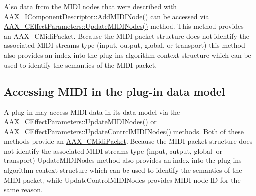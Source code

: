 Also data from the M\+I\+DI nodes that were described with \mbox{\hyperlink{a01781_a6284dda9ccca898e33075de29dad4e39}{A\+A\+X\+\_\+\+I\+Component\+Descriptor\+::\+Add\+M\+I\+D\+I\+Node()}} can be accessed via \mbox{\hyperlink{a01481_aac6fa72278c0f46aa430cd79bdb2d767}{A\+A\+X\+\_\+\+C\+Effect\+Parameters\+::\+Update\+M\+I\+D\+I\+Nodes()}} method. This method provides an \mbox{\hyperlink{a01429}{A\+A\+X\+\_\+\+C\+Midi\+Packet}}. Because the M\+I\+DI packet structure does not identify the associated M\+I\+DI stream\textquotesingle{}s type (input, output, global, or transport) this method also provides an index into the plug-\/in\textquotesingle{}s algorithm context structure which can be used to identify the semantics of the M\+I\+DI packet.\hypertarget{a00806_additionalFeatures_MIDI_DataModel}{}\subsection{Accessing M\+I\+D\+I in the plug-\/in data model}\label{a00806_additionalFeatures_MIDI_DataModel}
A plug-\/in may access M\+I\+DI data in its data model via the \mbox{\hyperlink{a01481_aac6fa72278c0f46aa430cd79bdb2d767}{A\+A\+X\+\_\+\+C\+Effect\+Parameters\+::\+Update\+M\+I\+D\+I\+Nodes()}} or \mbox{\hyperlink{a01481_ac6720637afc7a87adfd391c4ef59126f}{A\+A\+X\+\_\+\+C\+Effect\+Parameters\+::\+Update\+Control\+M\+I\+D\+I\+Nodes()}} methods. Both of these methods provide an \mbox{\hyperlink{a01429}{A\+A\+X\+\_\+\+C\+Midi\+Packet}}. Because the M\+I\+DI packet structure does not identify the associated M\+I\+DI stream\textquotesingle{}s type (input, output, global, or transport) Update\+M\+I\+D\+I\+Nodes method also provides an index into the plug-\/in\textquotesingle{}s algorithm context structure which can be used to identify the semantics of the M\+I\+DI packet, while Update\+Control\+M\+I\+D\+I\+Nodes provides M\+I\+DI node ID for the same reason.


